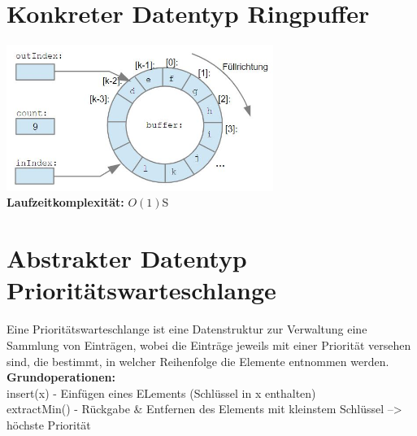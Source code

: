 \documentclass{scrreprt}
\begin{document}
\section{Konkreter Datentyp Ringpuffer}
\includegraphics[width=0.65\textwidth]{graphics/Ringpuffer}
\\\textbf{Laufzeitkomplexität:} $O(1)$S
\section{Abstrakter Datentyp Prioritätswarteschlange}
Eine Prioritätswarteschlange ist eine Datenstruktur zur Verwaltung eine Sammlung von Einträgen,
wobei die Einträge jeweils mit einer Priorität versehen sind, die bestimmt, in welcher
Reihenfolge die Elemente entnommen werden.
\\\textbf{Grundoperationen:}
\\ insert(x) - Einfügen eines ELements (Schlüssel in x enthalten)
\\ extractMin() - Rückgabe \& Entfernen des Elements mit kleinstem Schlüssel --> höchste Priorität
\end{document}
